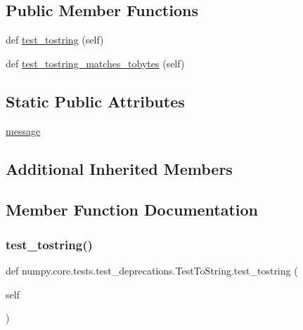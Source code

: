 \subsection*{Public Member Functions}
\begin{DoxyCompactItemize}
\item 
def \hyperlink{classnumpy_1_1core_1_1tests_1_1test__deprecations_1_1TestToString_a3f3cce0fb13be359c93840de4b0b9627}{test\+\_\+tostring} (self)
\item 
def \hyperlink{classnumpy_1_1core_1_1tests_1_1test__deprecations_1_1TestToString_abd818cd80e962c26f17468aab3f43553}{test\+\_\+tostring\+\_\+matches\+\_\+tobytes} (self)
\end{DoxyCompactItemize}
\subsection*{Static Public Attributes}
\begin{DoxyCompactItemize}
\item 
\hyperlink{classnumpy_1_1core_1_1tests_1_1test__deprecations_1_1TestToString_a1388163928e6bca76216f3c5096e64f6}{message}
\end{DoxyCompactItemize}
\subsection*{Additional Inherited Members}


\subsection{Member Function Documentation}
\mbox{\label{classnumpy_1_1core_1_1tests_1_1test__deprecations_1_1TestToString_a3f3cce0fb13be359c93840de4b0b9627}} 
\subsubsection{\texorpdfstring{test\+\_\+tostring()}{test\_tostring()}}
{\footnotesize\ttfamily def numpy.\+core.\+tests.\+test\+\_\+deprecations.\+Test\+To\+String.\+test\+\_\+tostring (\begin{DoxyParamCaption}\item[{}]{self }\end{DoxyParamCaption})}


